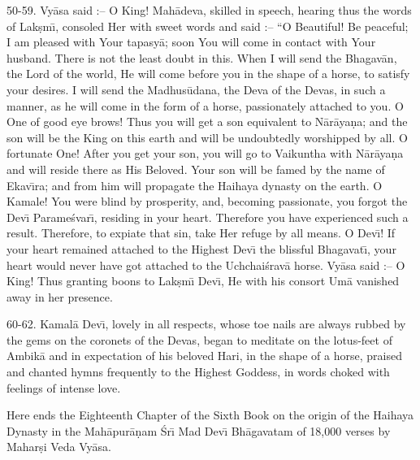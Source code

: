 50-59. Vy\=asa said :-- O King! Mah\=adeva, skilled in speech, hearing thus the words of Lak\d{s}m\={\i}, consoled Her with sweet words and said :-- ``O Beautiful! Be peaceful; I am pleased with Your tapasy\=a; soon You will come in contact with Your husband. There is not the least doubt in this. When I will send the Bhagav\=an, the Lord of the world, He will come before you in the shape of a horse, to satisfy your desires. I will send the Madhus\=udana, the Deva of the Devas, in such a manner, as he will come in the form of a horse, passionately attached to you. O One of good eye brows! Thus you will get a son equivalent to N\=ar\=aya\d{n}a; and the son will be the King on this earth and will be undoubtedly worshipped by all. O fortunate One! After you get your son, you will go to Vaikuntha with N\=ar\=aya\d{n}a and will reside there as His Beloved. Your son will be famed by the name of Ekav\={\i}ra; and from him will propagate the Haihaya dynasty on the earth. O Kamale! You were blind by prosperity, and, becoming passionate, you forgot the Dev\={\i} Parame\'svar\={\i}, residing in your heart. Therefore you have experienced such a result. Therefore, to expiate that sin, take Her refuge by all means. O Dev\={\i}! If your heart remained attached to the Highest Dev\={\i} the blissful Bhagavat\={\i}, your heart would never have got attached to the Uchchai\'srav\=a horse. Vy\=asa said :-- O King! Thus granting boons to Lak\d{s}m\={\i} Dev\={\i}, He with his consort Um\=a vanished away in her presence.

60-62. Kamal\=a Dev\={\i}, lovely in all respects, whose toe nails are always rubbed by the gems on the coronets of the Devas, began to meditate on the lotus-feet of Ambik\=a and in expectation of his beloved Hari, in the shape of a horse, praised and chanted hymns frequently to the Highest Goddess, in words choked with feelings of intense love.

Here ends the Eighteenth Chapter of the Sixth Book on the origin of the Haihaya Dynasty in the Mah\=apur\=a\d{n}am \'Sr\={\i} Mad Dev\={\i} Bh\=agavatam of 18,000 verses by Mahar\d{s}i Veda Vy\=asa.



